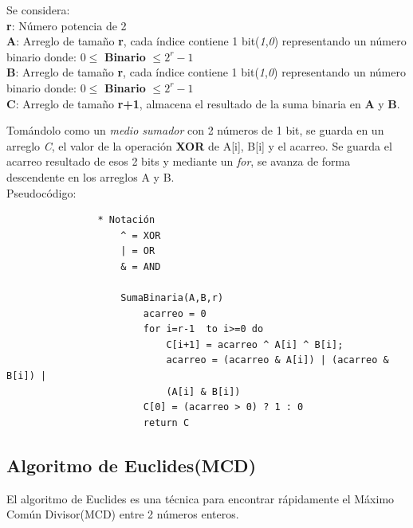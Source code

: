 \documentclass{report}
\begin{document}
                \hfill \break
        
                Se considera:\\
                \textbf{r}: Número potencia de 2\\
                \textbf{A}: Arreglo de tamaño \textbf{r}, cada índice contiene 1 bit(\textit{1},\textit{0}) representando un número binario donde: $0\leq$ \textbf{Binario} $\leq 2^r -1$\\
                \textbf{B}: Arreglo de tamaño \textbf{r}, cada índice contiene 1 bit(\textit{1},\textit{0}) representando un número binario donde: $0\leq$ \textbf{Binario} $\leq 2^r -1$\\
                \textbf{C}: Arreglo de tamaño \textbf{r+1}, almacena el resultado de la suma binaria en \textbf{A} y \textbf{B}.
                
                \hfill \break
                
                Tomándolo como un \textit{medio sumador} con 2 números de 1 bit, se guarda en un arreglo \textit{C}, el valor de la operación \textbf{XOR} de A[i], B[i] y el acarreo. Se guarda el acarreo resultado de esos 2 bits y mediante un \textit{for}, se avanza de forma descendente en los arreglos A y B. \\
                
                Pseudoc\'odigo:\\
            
                \begin{verbatim}
                * Notación
                    ^ = XOR
                    | = OR
                    & = AND
                
                    SumaBinaria(A,B,r)
                        acarreo = 0
                        for i=r-1  to i>=0 do
                            C[i+1] = acarreo ^ A[i] ^ B[i];
                            acarreo = (acarreo & A[i]) | (acarreo & B[i]) | 
                            (A[i] & B[i])
                        C[0] = (acarreo > 0) ? 1 : 0
                        return C
                \end{verbatim}
                
    \subsection*{Algoritmo de Euclides(MCD)}
        El algoritmo de Euclides es una t\'ecnica para encontrar r\'apidamente el M\'aximo Com\'un Divisor(MCD) entre 2 números enteros.\\
                
\end{document}
